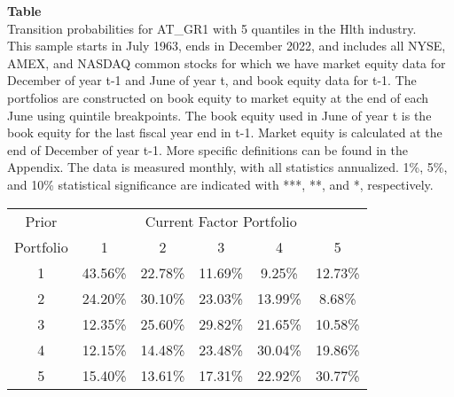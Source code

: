 \begin{table*}[ht!]
\raggedright
{}
\label{tab: transition_probs_AT_GR1_Hlth_with_5_quantiles}
\textbf{Table \thetable} \\
Transition probabilities for AT_GR1 with 5 quantiles in the Hlth industry. \\
\hspace*{1em}This sample starts in July 1963, ends in December 2022, and includes all NYSE, AMEX, and NASDAQ common stocks for which we have market equity data for December of year t-1 and June of year t, and book equity data for t-1. The portfolios are constructed on book equity to market equity at the end of each June using quintile breakpoints.  The book equity used in June of year t is the book equity for the last fiscal year end in t-1.  Market equity is calculated at the end of December of year t-1.  More specific definitions can be found in the Appendix.  The data is measured monthly, with all statistics annualized.  1\%, 5\%, and 10\% statistical significance are indicated with ***, **, and *, respectively. \\
\vspace{0.5em}
\centering
\begin{adjustbox}{max width=\textwidth}
\begin{tabular}{@{}cccccc@{}}
\toprule
Prior & \multicolumn{5}{c}{Current Factor Portfolio} \\
Portfolio & 1 & 2 & 3 & 4 & 5 \\
\midrule
1 & 43.56\% & 22.78\% & 11.69\% & 9.25\% & 12.73\% \\
2 & 24.20\% & 30.10\% & 23.03\% & 13.99\% & 8.68\% \\
3 & 12.35\% & 25.60\% & 29.82\% & 21.65\% & 10.58\% \\
4 & 12.15\% & 14.48\% & 23.48\% & 30.04\% & 19.86\% \\
5 & 15.40\% & 13.61\% & 17.31\% & 22.92\% & 30.77\% \\
\bottomrule
\end{tabular}
\end{adjustbox}
\end{table*}